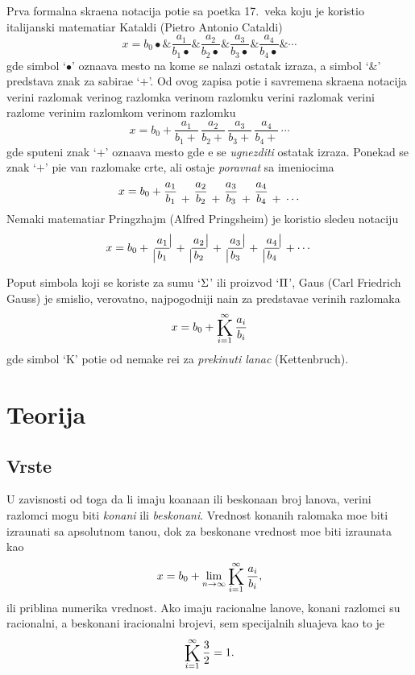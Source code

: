 \documentclass[12pt, twoside, a4paper]{article}
\def\vr#1{\ifcase#1\relax\or
  ve\-ri{\zv}\-ni raz\-lo\-mak\or
  ve\-ri{\zv}\-nog raz\-lom\-ka\or
  ve\-ri{\zv}\-nom raz\-lom\-ku\or
  ve\-ri{\zv}\-ni raz\-lo\-mak\or
  ve\-ri{\zv}\-ni raz\-lom\-{\cv}e\or
  ve\-ri{\zv}\-nim raz\-lom\-kom\or
  ve\-ri{\zv}\-nom raz\-lom\-ku\fi}
\begin{document}
\medskip

Prva formalna skra{\cc}ena notacija poti{\cv}e sa po{\cv}etka 17.~veka
koju je koristio italijanski matemati{\cv}ar Kataldi (Pietro Antonio Cataldi)
$$
x=b_0\bullet 
\& \frac{a_1}{b_1\bullet} 
\& \frac{a_2}{b_2\bullet} 
\& \frac{a_3}{b_3\bullet} 
\& \frac{a_4}{b_4\bullet} 
\& \cdots
$$
gde simbol `$\bullet$' ozna{\cv}ava mesto na kome se nalazi ostatak izraza, a simbol `$\&$' predstav{\lj}a
znak za sabira{\nj}e `$+$'.
Od ovog zapisa poti{\cv}e i savremena skra{\cc}ena notacija \vr2
$$
x=b_0+
\frac{a_1}{b_1+}\,
\frac{a_2}{b_2+}\,
\frac{a_3}{b_3+}\,
\frac{a_4}{b_4+}\,
\cdots
$$
gde spu{\sv}teni znak `$+$' ozna{\cv}ava mesto gde {\cc}e se {\sl ugnezditi\/} ostatak izraza.
Ponekad se znak `$+$' pi{\sv}e van razloma{\cv}ke crte, ali ostaje {\sl poravnat\/} sa imeniocima
\def\dop#1{\mathbin{{\atop#1}}}
\def\bplus{\dop+}
\def\fplus#1#2{\bplus\frac{#1}{#2}}
$$
x=b_0+
\frac{a_1}{b_1}
\fplus{a_2}{b_2}
\fplus{a_3}{b_3}
\fplus{a_4}{b_4}
\bplus{\atop\cdots}
$$
Nema{\cv}ki matemati{\cv}ar Pringzhajm (Alfred Pringsheim) je koristio slede{\cc}u notaciju
\def\dvert{{\atop {{\big |}\!}}\!}
\def\nvert{\!{{\!{\big |}} \atop}}
\def\pring#1#2{\dvert\frac{\,#1\,}{\,#2\,}\nvert}
$$
x=b_0
+\pring{a_1}{b_1}
+\pring{a_2}{b_2}
+\pring{a_3}{b_3}
+\pring{a_4}{b_4}
+\cdots
$$

\medskip

\def\K{\mathop{\vcenter{\hbox{\rm\huge K}}}\limits}
\def\Ki{\K_{i=1}}
\def\Kinf#1#2{\Ki^\infty\displaystyle{\frac{#1}{#2}}}

Poput simbola koji se koriste za sumu `$\rm\Sigma$' ili proizvod `$\rm\Pi$', 
Gaus (Carl Friedrich Gauss) je smislio, verovatno, najpogodniji na{\cv}in za predstav{\lj}a{\nj}e
veri{\zv}nih razlomaka
$$
x=b_0+\Kinf{a_i}{b_i}
$$
gde simbol `K' poti{\cv}e od nema{\cv}ke re{\cv}i za {\sl prekinuti lanac\/} (Kettenbruch). 


\section{Teorija}

\subsection{Vrste}

U zavisnosti od toga da li imaju koana{\cv}an ili beskona{\cv}an broj {\cv}lanova,
veri{\zv}ni razlomci mogu biti {\sl kona{\cv}ni\/} ili {\sl beskona{\cv}ni}.
Vrednost kona{\cv}nih ralomaka mo{\zv}e biti izra{\cv}unati sa apsolutnom ta{\cv}no{\sv}{\cc}u,
dok za beskona{\cv}ne vrednost mo{\zv}e biti izra{\cv}unata kao
$$x=b_0+\lim_{n\to\infty}\Kinf{a_i}{b_i},$$
ili pribli{\zv}na numeri{\cv}ka vrednost.
Ako imaju racionalne {\cv}lanove, kona{\cv}ni razlomci su racionalni, a beskona{\cv}ni
iracionalni brojevi, sem specijalnih slu{\cv}ajeva kao {\sv}to je
$$
\Kinf32=1.
$$
\end{document}
